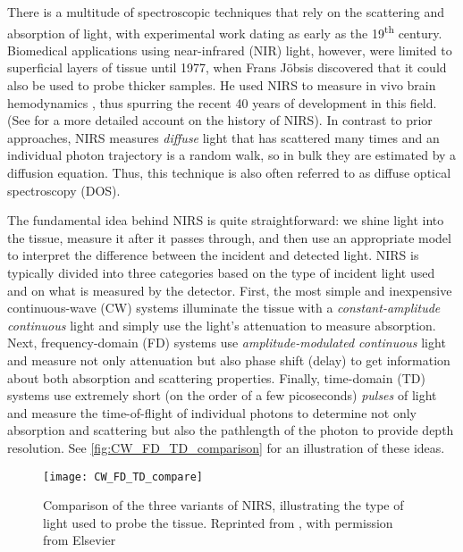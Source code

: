 There is a multitude of spectroscopic techniques that rely on the scattering and absorption of light, with experimental work dating as early as the 19\textsuperscript{th} century. Biomedical applications using near-infrared (NIR) light, however, were limited to superficial layers of tissue until 1977, when Frans J{\"o}bsis discovered that it could also be used to probe thicker samples. He used NIRS to measure in vivo brain hemodynamics \cite{Jobsis1977}, thus spurring the recent 40 years of development in this field. (See \cite{Ferrari2012} for a more detailed account on the history of NIRS). In contrast to prior approaches, NIRS measures \emph{diffuse} light that has scattered many times and an individual photon trajectory is a random walk, so in bulk they are estimated by a diffusion equation. Thus, this technique is also often referred to as diffuse optical spectroscopy (DOS). 

The fundamental idea behind NIRS is quite straightforward: we shine light into the tissue, measure it after it passes through, and then use an appropriate model to interpret the difference between the incident and detected light. NIRS is typically divided into three categories based on the type of incident light used and on what is measured by the detector. First, the most simple and inexpensive continuous-wave (CW) systems illuminate the tissue with a \emph{constant-amplitude continuous} light and simply use the light’s attenuation to measure absorption. Next, frequency-domain (FD) systems use \emph{amplitude-modulated continuous} light and measure not only attenuation but also phase shift (delay) to get information about both absorption and scattering properties. Finally, time-domain (TD) systems use extremely short (on the order of a few picoseconds) \emph{pulses} of light and measure the time-of-flight of individual photons to determine not only absorption and scattering but also the pathlength of the photon to provide depth resolution. See \autoref{fig:CW_FD_TD_comparison} for an illustration of these ideas. 

\begin{figure}[tb]
\centering
\texttt{[image: CW\_FD\_TD\_compare]}
\caption{Comparison of the three variants of NIRS, illustrating the type of light used to probe the tissue. Reprinted from \cite{Scholkmann2013}, with permission from Elsevier}
\label{fig:CW_FD_TD_comparison}
\end{figure}

